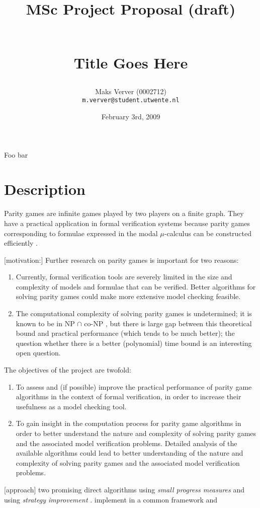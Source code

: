 \documentclass[11pt]{article}
\title{\begin{small}MSc Project Proposal (draft)\end{small}\\
Title Goes Here}
\author{Maks Verver (0002712)\\\texttt{m.verver@student.utwente.nl}}
\date{February 3rd, 2009}
\begin{document}
\maketitle
Foo bar
\section{Description}
Parity games are infinite games played by two players on a finite graph. They
have a practical application in formal verification systems because parity games
corresponding to formulae expressed in the modal $\mu$-calculus can be
constructed efficiently \cite{wilke1993}.

[motivation:] Further research on parity games is important for two reasons:
\begin{enumerate}
\item Currently, formal verification tools are severely limited in the size and
complexity of models and formulae that can be verified. Better algorithms for
solving parity games could make more extensive model checking feasible.

\item The computational complexity of solving parity games is undetermined; it
is known to be in NP $\cap$ co-NP \cite{emerson2001mcmu}, but there is large gap
between this theoretical bound and practical performance (which tends to be
much better); the question whether there is a better (polynomial) time bound is
an interesting open question.
\end{enumerate}

The objectives of the project are twofold:
\begin{enumerate}
\item To assess and (if possible) improve the practical performance of parity
game algorithms in the context of formal verification, in order to increase
their usefulness as a model checking tool.

\item To gain insight in the computation process for parity game algorithms in
order to better understand the nature and complexity of solving parity games
and the associated model verification problems. Detailed analysis of the
available algorithms could lead to better understanding of the nature and
complexity of solving parity games and the associated model verification
problems.
\end{enumerate}

[approach] two promising direct algorithms using \emph{small progress measures}
\cite{jurdzinski2000spm} and using \emph{strategy improvement} \cite{voge2000dsi}.
implement in a common framework and 
\end{document}

